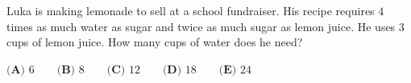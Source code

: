 Luka is making lemonade to sell at a school fundraiser. His recipe requires $4$ times as much water as sugar and twice as much sugar as lemon juice. He uses $3$ cups of lemon juice. How many cups of water does he need?

$\textbf{(A) }6\qquad\textbf{(B) }8\qquad\textbf{(C) }12\qquad\textbf{(D) }18\qquad\textbf{(E) }24$
